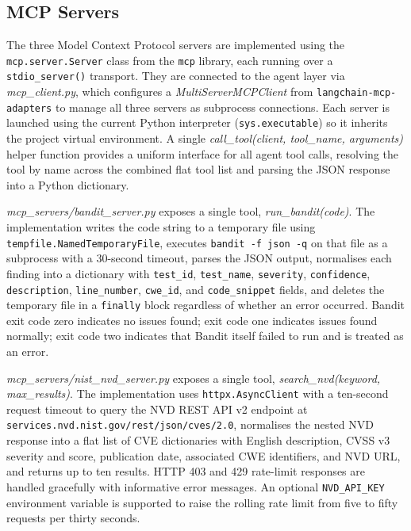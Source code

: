 \subsection{MCP Servers}

The three Model Context Protocol servers are implemented using the \texttt{mcp.server.Server} class from the \texttt{mcp} library, each running over a \texttt{stdio\_server()} transport. They are connected to the agent layer via \textit{mcp\_client.py}, which configures a \textit{MultiServerMCPClient} from \texttt{langchain-mcp-adapters} to manage all three servers as subprocess connections. Each server is launched using the current Python interpreter (\texttt{sys.executable}) so it inherits the project virtual environment. A single \textit{call\_tool(client, tool\_name, arguments)} helper function provides a uniform interface for all agent tool calls, resolving the tool by name across the combined flat tool list and parsing the JSON response into a Python dictionary.

\textit{mcp\_servers/bandit\_server.py} exposes a single tool, \textit{run\_bandit(code)}. The implementation writes the code string to a temporary file using \texttt{tempfile.NamedTemporaryFile}, executes \texttt{bandit -f json -q} on that file as a subprocess with a 30-second timeout, parses the JSON output, normalises each finding into a dictionary with \texttt{test\_id}, \texttt{test\_name}, \texttt{severity}, \texttt{confidence}, \texttt{description}, \texttt{line\_number}, \texttt{cwe\_id}, and \texttt{code\_snippet} fields, and deletes the temporary file in a \texttt{finally} block regardless of whether an error occurred. Bandit exit code zero indicates no issues found; exit code one indicates issues found normally; exit code two indicates that Bandit itself failed to run and is treated as an error.

\textit{mcp\_servers/nist\_nvd\_server.py} exposes a single tool, \textit{search\_nvd(keyword, max\_results)}. The implementation uses \texttt{httpx.AsyncClient} with a ten-second request timeout to query the NVD REST API v2 endpoint at \texttt{services.nvd.nist.gov/rest/json/cves/2.0}, normalises the nested NVD response into a flat list of CVE dictionaries with English description, CVSS v3 severity and score, publication date, associated CWE identifiers, and NVD URL, and returns up to ten results. HTTP 403 and 429 rate-limit responses are handled gracefully with informative error messages. An optional \texttt{NVD\_API\_KEY} environment variable is supported to raise the rolling rate limit from five to fifty requests per thirty seconds.

